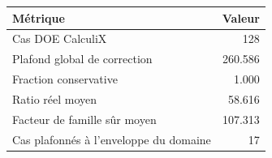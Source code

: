 \begin{tabular}{lr}
\toprule
Métrique & Valeur\\
\midrule
Cas DOE CalculiX & 128\\
Plafond global de correction & 260.586\\
Fraction conservative & 1.000\\
Ratio réel moyen & 58.616\\
Facteur de famille sûr moyen & 107.313\\
Cas plafonnés à l'enveloppe du domaine & 17\\
\bottomrule
\end{tabular}
